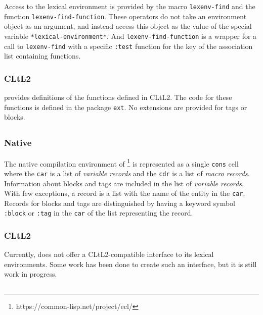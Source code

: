 Access to the lexical environment is provided by the macro
\texttt{lexenv-find} and the function \texttt{lexenv-find-function}.
These operators do not take an environment object as an argument, and
instead access this object as the value of the special variable
\texttt{*lexical-environment*}.  And
\texttt{lexenv-find-function} is a wrapper for a call to
\texttt{lexenv-find} with a specific \texttt{:test} function for the
key of the association list containing functions.

\subsubsection{CLtL2}

\cmucl{} provides definitions of the functions defined in CLtL2.  The
code for these functions is defined in the package \texttt{ext}.  No
extensions are provided for tags or blocks.

\subsection{\ecl{}}

\subsubsection{Native}

The native compilation environment of \ecl{}%
\footnote{https://common-lisp.net/project/ecl/}
is represented as a single \texttt{cons} cell where the \texttt{car}
is a list of \emph{variable records} and the \texttt{cdr} is a list of
\emph{macro records}.  Information about blocks and tags are included
in the list of \emph{variable records}.  With few exceptions, a record
is a list with the name of the entity in the \texttt{car}.  Records
for blocks and tags are distinguished by having a keyword symbol
\texttt{:block} or \texttt{:tag} in the \texttt{car} of the list
representing the record.

\subsubsection{CLtL2}

Currently, \ecl{} does not offer a CLtL2-compatible interface to its
lexical environments.  Some work has been done to create such an
interface, but it is still work in progress.

\subsection{\clasp{}}

